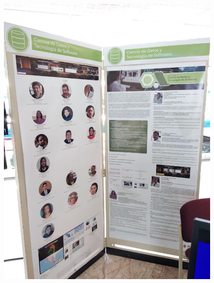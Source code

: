 \documentclass[11pt,letterpaper]{article}
\begin{document}
\begin{figure}[H]
	\centering
	\includegraphics[scale = 0.4]{images/data}
\end{figure}
\end{document}

